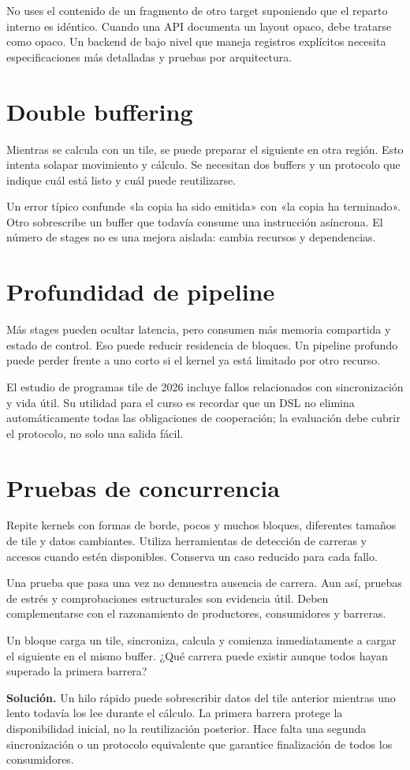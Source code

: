 \documentclass[12pt,a4paper,oneside]{report}
\begin{document}
No uses el contenido de un fragmento de otro target suponiendo que el reparto interno es idéntico. Cuando una API documenta un layout opaco, debe tratarse como opaco. Un backend de bajo nivel que maneja registros explícitos necesita especificaciones más detalladas y pruebas por arquitectura.

\section{Double buffering}
Mientras se calcula con un tile, se puede preparar el siguiente en otra región. Esto intenta solapar movimiento y cálculo. Se necesitan dos buffers y un protocolo que indique cuál está listo y cuál puede reutilizarse.

Un error típico confunde «la copia ha sido emitida» con «la copia ha terminado». Otro sobrescribe un buffer que todavía consume una instrucción asíncrona. El número de stages no es una mejora aislada: cambia recursos y dependencias.

\section{Profundidad de pipeline}
Más stages pueden ocultar latencia, pero consumen más memoria compartida y estado de control. Eso puede reducir residencia de bloques. Un pipeline profundo puede perder frente a uno corto si el kernel ya está limitado por otro recurso.

El estudio de programas tile de 2026 incluye fallos relacionados con sincronización y vida útil. Su utilidad para el curso es recordar que un DSL no elimina automáticamente todas las obligaciones de cooperación; la evaluación debe cubrir el protocolo, no solo una salida fácil. \cite{tile-bugs}

\section{Pruebas de concurrencia}
Repite kernels con formas de borde, pocos y muchos bloques, diferentes tamaños de tile y datos cambiantes. Utiliza herramientas de detección de carreras y accesos cuando estén disponibles. Conserva un caso reducido para cada fallo.

Una prueba que pasa una vez no demuestra ausencia de carrera. Aun así, pruebas de estrés y comprobaciones estructurales son evidencia útil. Deben complementarse con el razonamiento de productores, consumidores y barreras.

\begin{practica}
Un bloque carga un tile, sincroniza, calcula y comienza inmediatamente a cargar el siguiente en el mismo buffer. ¿Qué carrera puede existir aunque todos hayan superado la primera barrera?

\end{practica}
\textbf{Solución.} Un hilo rápido puede sobrescribir datos del tile anterior mientras uno lento todavía los lee durante el cálculo. La primera barrera protege la disponibilidad inicial, no la reutilización posterior. Hace falta una segunda sincronización o un protocolo equivalente que garantice finalización de todos los consumidores.
\end{document}
